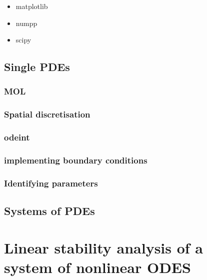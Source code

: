 \documentclass[
  letterpaper,
  DIV=11,
  numbers=noendperiod]{scrreprt}
\providecommand{\tightlist}{%
  \setlength{\itemsep}{0pt}\setlength{\parskip}{0pt}}\usepackage{longtable,booktabs,array}
\theoremstyle{plain}
\theoremstyle{definition}
\theoremstyle{plain}
\theoremstyle{remark}
\begin{document}
\begin{itemize}
\tightlist
\item
  matplotlib
\item
  numpp
\item
  scipy
\end{itemize}

\hypertarget{single-pdes}{%
\section{Single PDEs}\label{single-pdes}}

\hypertarget{mol}{%
\subsection{MOL}\label{mol}}

\hypertarget{spatial-discretisation}{%
\subsection{Spatial discretisation}\label{spatial-discretisation}}

\hypertarget{odeint}{%
\subsection{odeint}\label{odeint}}

\hypertarget{implementing-boundary-conditions}{%
\subsection{implementing boundary
conditions}\label{implementing-boundary-conditions}}

\hypertarget{identifying-parameters}{%
\subsection{Identifying parameters}\label{identifying-parameters}}

\hypertarget{systems-of-pdes}{%
\section{Systems of PDEs}\label{systems-of-pdes}}

\hypertarget{linear-stability-analysis-of-a-system-of-nonlinear-odes}{%
\chapter{Linear stability analysis of a system of nonlinear
ODES}\label{linear-stability-analysis-of-a-system-of-nonlinear-odes}}
\end{document}
